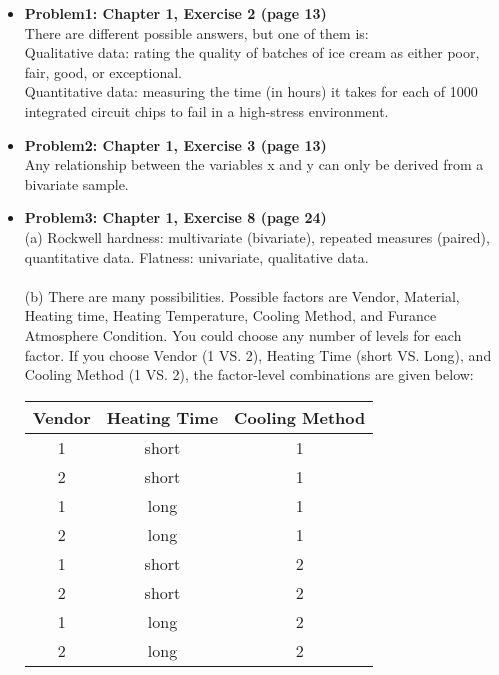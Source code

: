 \documentclass[11pt]{article}\usepackage[]{graphicx}\usepackage[]{color}
\begin{document}
\pagestyle{fancy} 
\begin{itemize}

\item \textbf{Problem1: Chapter 1, Exercise 2 (page 13)} \\
There are different possible answers, but one of them is:\\
Qualitative data: rating the quality of batches of ice cream as either poor, fair, good, or exceptional.\\
Quantitative data: measuring the time (in hours) it takes for each of 1000 integrated circuit chips to fail in a high-stress environment.


\item \textbf{Problem2: Chapter 1, Exercise 3 (page 13)}\\
Any relationship between the variables x and y can only be derived from a bivariate sample. \\

\item \textbf{Problem3: Chapter 1, Exercise 8 (page 24)}\\
(a) Rockwell hardness: multivariate (bivariate), repeated measures (paired), quantitative data. Flatness: univariate, qualitative data.\\
\\
(b) There are many possibilities. Possible factors are Vendor, Material, Heating time, Heating Temperature, Cooling Method, and Furance Atmosphere Condition. You could choose any number of levels for each factor. If you choose Vendor (1 VS. 2), Heating Time (short VS. Long), and Cooling Method (1 VS. 2), the factor-level combinations are given below:
\hspace{1in}
\begin{center}
	\begin{tabular}{|c|c|c|}\hline
		 Vendor & Heating Time & Cooling Method   \\ [0.5ex] 
		 \hline\hline
		1 & short&1 \\
		2 & short&1 \\
		1 & long&1  \\
		2 & long&1 \\
		1 & short&2 \\
		2 & short&2  \\
		1 & long&2  \\
		2 & long&2  \\
		\hline
	\end{tabular}
\end{center}
\hspace{1 in}



\end{itemize}
\end{document}
